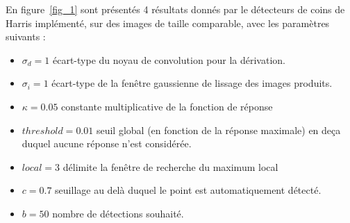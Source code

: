 \documentclass[12pt,a4paper,onecolumn]{article}
\begin{document}
En figure~\ref{fig_1} sont présentés 4 résultats donnés par le détecteurs de coins de Harris implémenté, sur des images de taille comparable, avec les paramètres suivants :
\begin{itemize}
	\item \( \sigma_d = 1\) écart-type du noyau de convolution pour la dérivation.
	\item \( \sigma_i = 1\) écart-type de la fenêtre gaussienne de lissage des images produits.
	\item \( \kappa = 0.05\) constante multiplicative de la fonction de réponse
	\item \( threshold = 0.01\) seuil global (en fonction de la réponse maximale) en deça duquel aucune réponse n'est considérée.
	\item \(local = 3\) délimite la fenêtre de recherche du maximum local
	\item \(c = 0.7\) seuillage au delà duquel le point est automatiquement détecté.
	\item \( b = 50\) nombre de détections souhaité.
\end{itemize}
\end{document}
